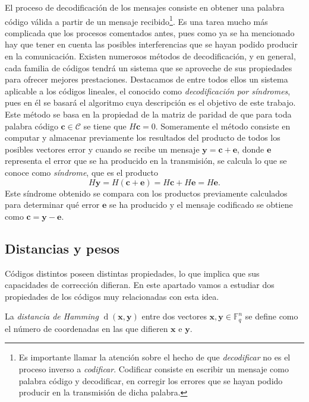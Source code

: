 El proceso de decodificación de los mensajes consiste en obtener una palabra código válida a partir de un mensaje recibido\footnote{Es importante llamar la atención sobre el hecho de que \textit{decodificar} no es el proceso inverso a \textit{codificar}. Codificar consiste en escribir un mensaje como palabra código y decodificar, en corregir los errores que se hayan podido producir en la transmisión de dicha palabra.}. 
Es una tarea mucho más complicada que los procesos comentados antes, pues como ya se ha mencionado hay que tener en cuenta las posibles interferencias que se hayan podido producir en la comunicación.
Existen numerosos métodos de decodificación, y en general, cada familia de códigos tendrá un sistema que se aproveche de sus propiedades para ofrecer mejores prestaciones.
Destacamos de entre todos ellos un sistema aplicable a los códigos lineales, el conocido como \emph{decodificación por síndromes}, pues en él se basará el algoritmo cuya descripción es el objetivo de este trabajo.
Este método se basa en la propiedad de la matriz de paridad de que para toda palabra código \(\mathbf{c} \in \mathcal C\) se tiene que \(H \mathbf{c} = 0\).
Someramente el método consiste en computar y almacenar previamente los resultados del producto de todos los posibles vectores error y cuando se recibe un mensaje \(\mathbf{y} = \mathbf{c} + \mathbf{e}\), donde \(\mathbf{e}\) representa el error que se ha producido en la transmisión, se calcula lo que se conoce como \emph{síndrome}, que es el producto
\[
  H \mathbf{y} = H(\mathbf{c} + \mathbf{e}) = H \mathbf{c} + H \mathbf{e} = H \mathbf{e}.
\]
Este síndrome obtenido se compara con los productos previamente calculados para determinar qué error \(\mathbf{e}\) se ha producido y el mensaje codificado se obtiene como \(\mathbf{c} = \mathbf{y} - \mathbf{e}\).

\subsection{Distancias y pesos}

Códigos distintos poseen distintas propiedades, lo que implica que sus capacidades de corrección difieran.
En este apartado vamos a estudiar dos propiedades de los códigos muy relacionadas con esta idea.

\begin{definition}
  La \textit{distancia de Hamming} \(\operatorname{d}(\mathbf{x}, \mathbf{y})\) entre dos vectores \(\mathbf{x}, \mathbf{y} \in \mathbb F_q^n\) se define como el número de coordenadas en las que difieren \(\mathbf{x}\) e \(\mathbf{y}\).
\end{definition}

